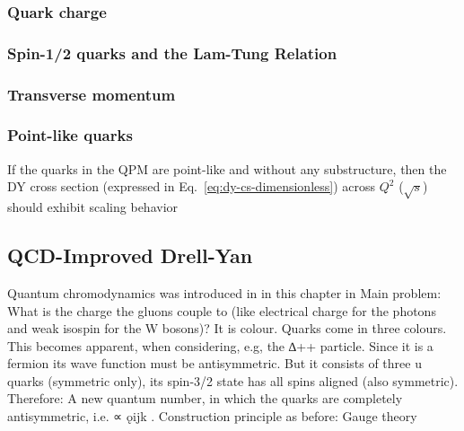 \subsubsection{Quark charge}



\subsubsection{Spin-1/2 quarks and the Lam-Tung Relation}


\subsubsection{Transverse momentum}


\subsubsection{Point-like quarks}

If the quarks in the QPM are point-like and without any substructure, then the DY cross section (expressed in Eq.~\ref{eq:dy-cs-dimensionless}) across $Q^2$ ($\sqrt{s}$) should exhibit scaling behavior 


\subsection{QCD-Improved Drell-Yan}

Quantum chromodynamics was introduced in in this chapter in Main problem: What is the
charge the gluons couple to (like electrical charge for the photons
and weak isospin for the W bosons)?
It is colour. Quarks come in three colours. This becomes apparent,
when considering, e.g, the ∆++ particle. Since it is a fermion its
wave function must be antisymmetric. But it consists of three u
quarks (symmetric only), its spin-3/2 state has all spins aligned (also
symmetric). Therefore: A new quantum number, in which the
quarks are completely antisymmetric, i.e. ∝ ǫijk .
Construction principle as before: Gauge theory


